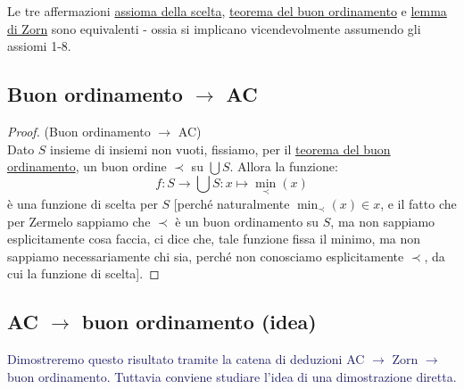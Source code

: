 \documentclass[11pt]{scrartcl}
\begin{document}
\begin{theorem}
	Le tre affermazioni \hyperref[ax9]{assioma della scelta}, \hyperref[buon_ordinamento]{teorema del buon ordinamento} e \hyperref[Zorn]{lemma di Zorn} sono equivalenti -
	ossia si implicano vicendevolmente assumendo gli assiomi 1-8.
\end{theorem}

\subsection{\texorpdfstring{Buon ordinamento $\rightarrow$ AC}{Buon ordinamento implica AC}}

\begin{proof}
	(Buon ordinamento $\rightarrow$ AC)\\
	Dato $S$ insieme di insiemi non vuoti, fissiamo, per il \hyperref[buon_ordinamento]{teorema del buon ordinamento}, un buon ordine $\prec$ su $\bigcup S$. Allora la funzione:
	\[ f : S \rightarrow \bigcup S : x \mapsto \min_{\prec}(x)
		\]
	è una funzione di scelta per $S$ [perché naturalmente $\min_\prec (x) \in x$, e il fatto che per Zermelo sappiamo che $\prec$ è un buon ordinamento su $S$, ma non sappiamo esplicitamente cosa faccia, ci dice che, tale funzione fissa il minimo, ma non sappiamo necessariamente chi sia, perché non 
	conosciamo esplicitamente $\prec$, da cui la funzione di scelta].
\end{proof}

\subsection{\texorpdfstring{AC $\rightarrow$ buon ordinamento (idea)}{AC implica buon ordinamento (idea)}}
\textcolor{MidnightBlue}{Dimostreremo questo risultato tramite la catena di deduzioni AC $\rightarrow$ Zorn $\rightarrow$ buon ordinamento. Tuttavia conviene studiare l'idea di una dimostrazione diretta.}
\end{document}
